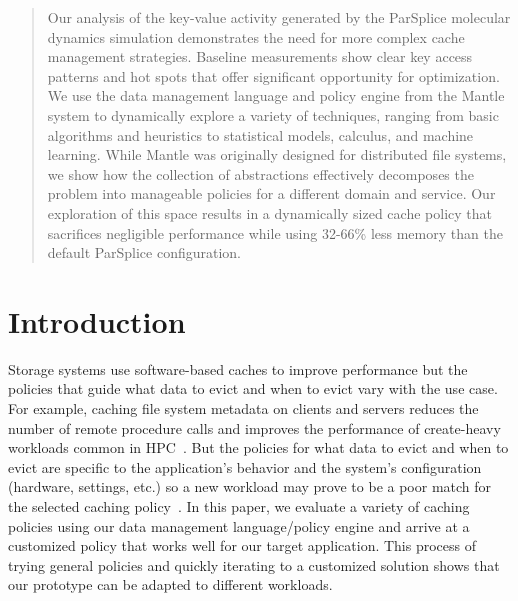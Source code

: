 \begin{abstract}

Our analysis of the key-value activity generated by the ParSplice molecular
dynamics simulation demonstrates the need for more complex cache management
strategies. Baseline measurements show clear key access patterns and hot spots
that offer significant opportunity for optimization. We use the data management
language and policy engine from the Mantle system to dynamically explore a
variety of techniques, ranging from basic algorithms and heuristics to
statistical models, calculus, and machine learning. While Mantle was originally
designed for distributed file systems, we show how the collection of
abstractions effectively decomposes the problem into manageable policies for a
different domain and service.  Our exploration of this space results in a
dynamically sized cache policy that sacrifices negligible performance while
using 32-66\% less memory than the default ParSplice configuration.

\end{abstract}

\section{Introduction}

Storage systems use software-based caches to improve performance but the
policies that guide what data to evict and when to evict vary with the use
case. For example, caching file system metadata on clients and servers reduces
the number of remote procedure calls and improves the performance of
create-heavy workloads common in HPC~\cite{ren:sc2014-indexfs,
patil:fast2011-giga+}. But the policies for what data to evict and when to
evict are specific to the application's behavior and the system's configuration
(hardware, settings, etc.) so a new workload may prove to be a poor match for
the selected caching
policy~\cite{xiao:socc15-shardfs,brandt:msst2003-lh,sevilla:sc15-mantle,
weil:sc2004-dyn-metadata, weil:osdi2006-ceph}. In this paper, we evaluate a
variety of caching policies using our data management language/policy engine and
arrive at a customized policy that works well for our target application.  This
process of trying general policies and quickly iterating to a customized
solution shows that our prototype can be adapted to different workloads.


